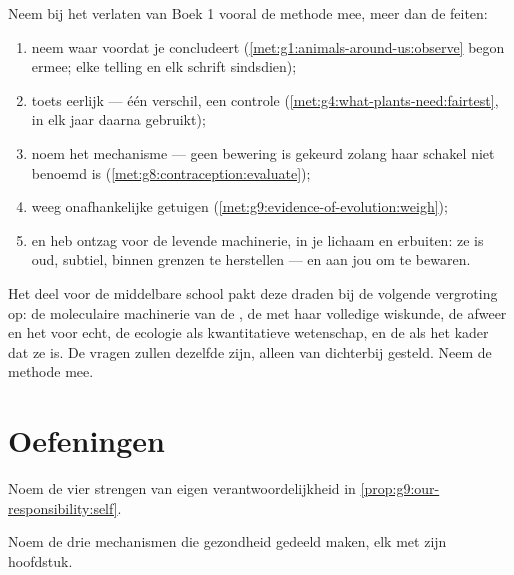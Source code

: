 \begin{method}\label{met:g9:our-responsibility:method}
Neem bij het verlaten van Boek 1 vooral de methode mee, meer dan de
feiten:
\begin{enumerate}
  \item neem waar voordat je concludeert
        (\cref{met:g1:animals-around-us:observe} begon ermee; elke
        telling en elk schrift sindsdien);
  \item toets eerlijk --- één verschil, een controle
        (\cref{met:g4:what-plants-need:fairtest}, in elk jaar
        daarna gebruikt);
  \item noem het mechanisme --- geen bewering is gekeurd zolang
        haar schakel niet benoemd is
        (\cref{met:g8:contraception:evaluate});
  \item weeg onafhankelijke getuigen
        (\cref{met:g9:evidence-of-evolution:weigh});
  \item en heb ontzag voor de levende machinerie, in je lichaam en
        erbuiten: ze is oud, subtiel, binnen grenzen te herstellen
        --- en aan jou om te bewaren.
\end{enumerate}
\end{method}

\begin{remark}\label{rem:g9:our-responsibility:next}
Het deel voor de middelbare school pakt deze draden bij de volgende
vergroting op: de moleculaire machinerie van de , de 
met haar volledige wiskunde, de afweer en het  voor
echt, de ecologie als kwantitatieve wetenschap, en de  als
het kader dat ze is. De vragen zullen dezelfde zijn, alleen van
dichterbij gesteld. Neem de methode mee.
\end{remark}

\section{Oefeningen}

\begin{exercise}[$\star$]\label{exo:g9:our-responsibility:1}
Noem de vier strengen van eigen verantwoordelijkheid in
\cref{prop:g9:our-responsibility:self}.
\end{exercise}

\begin{exercise}[$\star$]\label{exo:g9:our-responsibility:2}
Noem de drie mechanismen die gezondheid gedeeld maken, elk met zijn
hoofdstuk.
\end{exercise}

